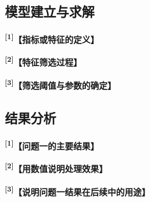 \documentclass[UTF8,a4paper,12pt,fontset=fandol]{ctexart}
\newif\ifDraftAid
\newcommand{\ph}[1]{\textbf{\color{phg}【#1】}}
\newcommand{\detail}[1]{%
  \ifDraftAid\textnormal{\color{detailg}\small\,（参考写法：#1）}\fi}
\newcommand{\PHD}[2]{\ph{#1}\detail{#2}}
\newcommand{\SN}[1]{\textsuperscript{\color{noteg}\bfseries[#1]}}
\newcommand{\Note}[2]{\par\noindent\textbf{[#1]}\ #2}
\newcommand{\Annotated}[2]{%
\ifDraftAid
\noindent\begin{minipage}[t]{0.735\linewidth}\vspace{0pt}#1\end{minipage}\hfill
\begin{minipage}[t]{0.235\linewidth}\vspace{0pt}\footnotesize\color{noteg}\raggedright
\begin{tcolorbox}[colback=notebg,colframe=ruleg,boxrule=0.35pt,arc=1mm,left=1.2mm,right=1.2mm,top=1mm,bottom=1mm]
#2
\end{tcolorbox}\end{minipage}
\else
#1
\fi
}
\numberwithin{figure}{section}
\numberwithin{table}{section}
\begin{document}
\subsection{模型建立与求解}
\Annotated{
\SN{1}\PHD{指标或特征的定义}{根据〔相关理论或数据特征〕，〔目标现象〕主要体现在〔性质A〕和〔性质B〕。因此本文定义第 $k$ 个指标为
\begin{equation}
 f_k(\bm{x})=\ph{第 $k$ 个指标或特征的数学定义}.
\end{equation}
式中，〔项A〕表示〔含义A〕，〔项B〕表示〔含义B〕；该指标的变化可以反映〔实际含义〕，其取值越〔大/小〕说明〔实际状态〕越明显，与〔相关机理或实际经验〕基本一致。}

\par\medskip
\SN{2}\PHD{特征筛选过程}{本文首先采用〔相关性、显著性或互信息等方法〕分析各特征与〔目标变量〕之间的关系，分别评估特征与目标之间的〔线性与非线性关系〕，从而筛选出关系较强的特征，并剔除不相关或冗余的特征；随后利用〔主成分分析、特征重要性或共线性分析〕进一步减少重复信息，保留最具代表性的特征。综合不同方法的结果，最终保留〔数量〕个具有代表性的特征，这些特征涵盖了〔各维度〕的信息，能够全面地反映〔研究对象〕的不同方面。}

\par\medskip
\SN{3}\PHD{筛选阈值与参数的确定}{特征筛选中的阈值取为〔数值或规则〕，该取值根据〔训练数据的统计结果、理论范围或交叉验证结果〕确定。模型建立后不再根据最终测试结果重新修改筛选规则，以保证评价结果具有可比性。}
}{
\Note{1}{重要公式前说明用途，公式后解释主要符号及其实际含义。}
\Note{2}{若采用多种特征筛选方法，应说明各方法分别解决什么问题。}
\Note{3}{经验阈值、权重和关键参数要说明取值依据。}
}

\subsection{结果分析}
\Annotated{
\SN{1}\PHD{问题一的主要结果}{经上述分析，最终得到〔数量〕个〔特征或指标〕。其中，〔代表特征A〕在不同〔状态或类别〕下表现出〔主要规律〕，〔代表特征B〕的差异较为明显，与〔已有理论或实际现象〕基本一致，说明这些特征能够有效反映〔目标现象〕的变化规律。}

\par\medskip
\SN{2}\PHD{用数值说明处理效果}{由图〔编号〕和表〔编号〕可以看出，处理后〔评价指标〕由〔数值A〕提高/降低至〔数值B〕，同时〔另一指标或统计量〕也有明显改善。这一结果表明，本文的数据处理和特征提取能够较好地保留〔有效信息〕并减少〔干扰因素〕，进一步说明了〔处理方法〕的正确性和有效性。}

\par\medskip
\SN{3}\PHD{说明问题一结果在后续中的用途}{综上，本文将〔问题一得到的特征或数据集〕作为本问最终结果，并在问题二中以此作为模型输入。后续比较不同模型时保持该部分数据处理方法不变。}
}{
\Note{1}{结果段第一句先说“最后得到什么”。}
\Note{2}{除主要数值外，可配合图形、相关性或其他指标说明结果。}
\Note{3}{问题二比较模型时尽量采用相同的数据处理结果。}
}
\end{document}
